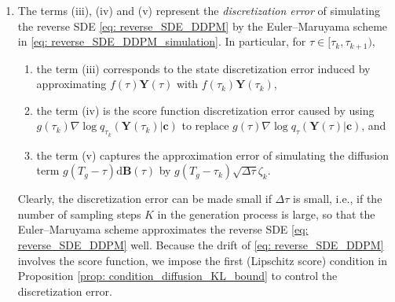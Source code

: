 \documentclass[11pt]{article}
\newcommand{\bY}{\mathbf{Y}}
\newcommand{\bc}{\mathbf{c}}
\newcommand{\bB}{\mathbf{B}}
\newcommand{\intd}{\mathrm{d}}
\begin{document}
\begin{enumerate}
    \item The terms (iii), (iv) and (v) represent the \textit{discretization error} of simulating the reverse SDE \eqref{eq: reverse_SDE_DDPM} by the Euler--Maruyama scheme in \eqref{eq: reverse_SDE_DDPM_simulation}. In particular, for $\tau\in[\tau_k, \tau_{k + 1})$,
    \begin{enumerate}
        \item[3(a)] the term (iii) corresponds to the state discretization error induced by approximating $f(\tau)\bY(\tau)$ with $f(\tau_k)\bY(\tau_k)$,
        \item[3(b)] the term (iv) is the score function discretization error caused by using $g(\tau_k)\nabla\log q_{\tau_k}(\bY(\tau_k)|\bc)$ to replace $g(\tau)\nabla\log q_{\tau}(\bY(\tau)|\bc)$, and
        \item[3(c)] the term (v) captures the approximation error of simulating the diffusion term $g(T_g - \tau)\intd\bB(\tau)$ by $g(T_g - \tau_k)\sqrt{\Delta\tau}\zeta_k$. 
    \end{enumerate}
    Clearly,  the discretization error can be made small if $\Delta \tau$ is small, i.e., if the number of sampling steps $K$ in the generation process is large, so that the Euler--Maruyama scheme approximates the reverse SDE \eqref{eq: reverse_SDE_DDPM} well. Because the drift of \eqref{eq: reverse_SDE_DDPM} involves the score function, we impose the first (Lipschitz score) condition
in Proposition \ref{prop: condition_diffusion_KL_bound} to control the discretization error.
\end{enumerate}
\end{document}

